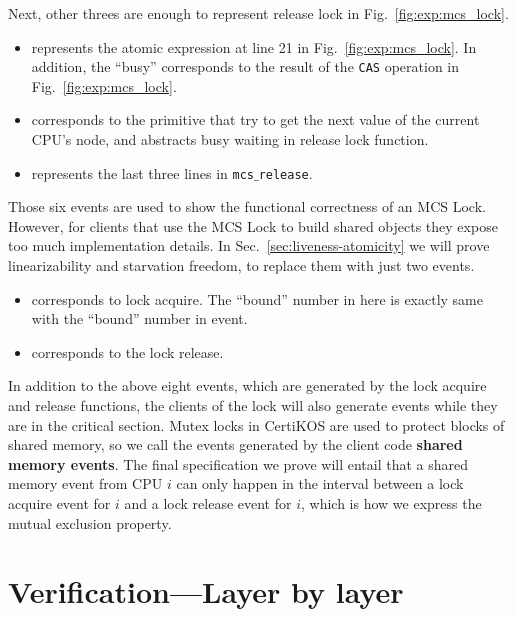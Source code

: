 Next, other threes are enough to represent release lock in Fig.~\ref{fig:exp:mcs_lock}.

\begin{itemize}

\item \textbf{} represents the atomic expression at line 21  in Fig.~\ref{fig:exp:mcs_lock}. 
In addition, the ``busy'' corresponds to the result of the \texttt{CAS} operation in Fig.~\ref{fig:exp:mcs_lock}.

\item  \textbf{\getnext} corresponds to the primitive that try to get the next value of the current CPU's node, and abstracts busy waiting in release lock function.

\item  \textbf{\setbusy} represents the last three lines in \texttt{mcs$\_$release}.
\end{itemize}

Those six events are used to show the functional correctness of
an MCS Lock. However, for clients that use the MCS Lock to build shared
objects they expose too much implementation details.
In Sec.~\ref{sec:liveness-atomicity} we will prove linearizability and
starvation freedom,  to replace them
with just two events.


\begin{itemize} 
\item \textbf{} corresponds to lock acquire. The ``bound'' number in here is exactly same with the ``bound'' number in  event.

\item \textbf{\rellock} corresponds to the lock release.
\end{itemize}

In addition to the above eight events, which are generated by the lock
acquire and release functions, the clients of the lock will also
generate events while they are in the critical section. Mutex locks in
CertiKOS are used to protect blocks of shared memory, so we call the
events generated by the client code \textbf{shared memory events}. The
final specification we prove will entail that a shared memory event
from CPU $i$ can only happen in the interval between a lock acquire
event for $i$ and a lock release event for $i$, which is how we
express the mutual exclusion property.

\section{Verification---Layer by layer}
\label{sec:verification}

